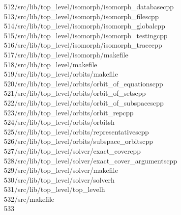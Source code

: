 \begin{tabbing}
512\>/src/lib/top\_level/isomorph/isomorph\_databasecpp\\[0pt]
513\>/src/lib/top\_level/isomorph/isomorph\_filescpp\\[0pt]
514\>/src/lib/top\_level/isomorph/isomorph\_globalcpp\\[0pt]
515\>/src/lib/top\_level/isomorph/isomorph\_testingcpp\\[0pt]
516\>/src/lib/top\_level/isomorph/isomorph\_tracecpp\\[0pt]
517\>/src/lib/top\_level/isomorph/makefile\\[0pt]
518\>/src/lib/top\_level/makefile\\[0pt]
519\>/src/lib/top\_level/orbits/makefile\\[0pt]
520\>/src/lib/top\_level/orbits/orbit\_of\_equationscpp\\[0pt]
521\>/src/lib/top\_level/orbits/orbit\_of\_setscpp\\[0pt]
522\>/src/lib/top\_level/orbits/orbit\_of\_subspacescpp\\[0pt]
523\>/src/lib/top\_level/orbits/orbit\_repcpp\\[0pt]
524\>/src/lib/top\_level/orbits/orbitsh\\[0pt]
525\>/src/lib/top\_level/orbits/representativescpp\\[0pt]
526\>/src/lib/top\_level/orbits/subspace\_orbitscpp\\[0pt]
527\>/src/lib/top\_level/solver/exact\_covercpp\\[0pt]
528\>/src/lib/top\_level/solver/exact\_cover\_argumentscpp\\[0pt]
529\>/src/lib/top\_level/solver/makefile\\[0pt]
530\>/src/lib/top\_level/solver/solverh\\[0pt]
531\>/src/lib/top\_level/top\_levelh\\[0pt]
532\>/src/makefile\\[0pt]
533\>\end{tabbing}
